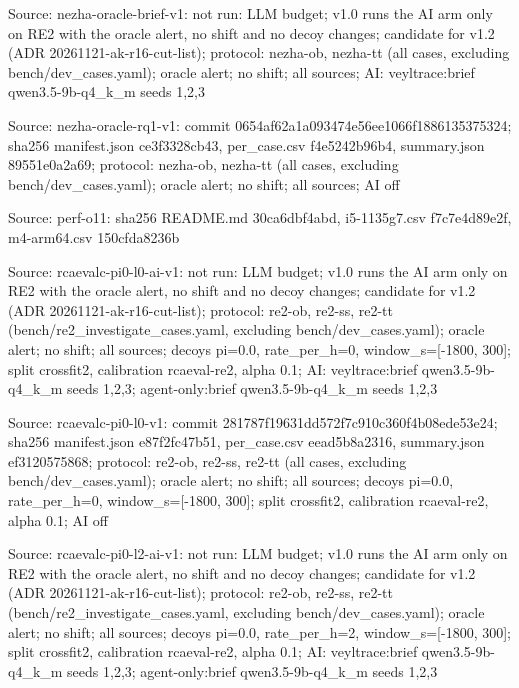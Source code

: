 \noindent Source: nezha-oracle-brief-v1: not run: LLM budget; v1.0 runs the AI arm only on RE2 with the oracle alert, no shift and no decoy changes; candidate for v1.2 (ADR 20261121-ak-r16-cut-list); protocol: nezha-ob, nezha-tt (all cases, excluding bench/\allowbreak{}dev\_cases.yaml); oracle alert; no shift; all sources; AI: veyltrace:brief qwen3.5-9b-q4\_k\_m seeds 1,2,3\par
\noindent Source: nezha-oracle-rq1-v1: commit 0654af62a1a093474e56ee1066f1886135375324; sha256 manifest.json ce3f3328cb43, per\_case.csv f4e5242b96b4, summary.json 89551e0a2a69; protocol: nezha-ob, nezha-tt (all cases, excluding bench/\allowbreak{}dev\_cases.yaml); oracle alert; no shift; all sources; AI off\par
\noindent Source: perf-o11: sha256 README.md 30ca6dbf4abd, i5-1135g7.csv f7c7e4d89e2f, m4-arm64.csv 150cfda8236b\par
\noindent Source: rcaevalc-pi0-l0-ai-v1: not run: LLM budget; v1.0 runs the AI arm only on RE2 with the oracle alert, no shift and no decoy changes; candidate for v1.2 (ADR 20261121-ak-r16-cut-list); protocol: re2-ob, re2-ss, re2-tt (bench/\allowbreak{}re2\_investigate\_cases.yaml, excluding bench/\allowbreak{}dev\_cases.yaml); oracle alert; no shift; all sources; decoys pi=0.0, rate\_per\_h=0, window\_s=[-1800, 300]; split crossfit2, calibration rcaeval-re2, alpha 0.1; AI: veyltrace:brief qwen3.5-9b-q4\_k\_m seeds 1,2,3; agent-only:brief qwen3.5-9b-q4\_k\_m seeds 1,2,3\par
\noindent Source: rcaevalc-pi0-l0-v1: commit 281787f19631dd572f7c910c360f4b08ede53e24; sha256 manifest.json e87f2fc47b51, per\_case.csv eead5b8a2316, summary.json ef3120575868; protocol: re2-ob, re2-ss, re2-tt (all cases, excluding bench/\allowbreak{}dev\_cases.yaml); oracle alert; no shift; all sources; decoys pi=0.0, rate\_per\_h=0, window\_s=[-1800, 300]; split crossfit2, calibration rcaeval-re2, alpha 0.1; AI off\par
\noindent Source: rcaevalc-pi0-l2-ai-v1: not run: LLM budget; v1.0 runs the AI arm only on RE2 with the oracle alert, no shift and no decoy changes; candidate for v1.2 (ADR 20261121-ak-r16-cut-list); protocol: re2-ob, re2-ss, re2-tt (bench/\allowbreak{}re2\_investigate\_cases.yaml, excluding bench/\allowbreak{}dev\_cases.yaml); oracle alert; no shift; all sources; decoys pi=0.0, rate\_per\_h=2, window\_s=[-1800, 300]; split crossfit2, calibration rcaeval-re2, alpha 0.1; AI: veyltrace:brief qwen3.5-9b-q4\_k\_m seeds 1,2,3; agent-only:brief qwen3.5-9b-q4\_k\_m seeds 1,2,3\par
